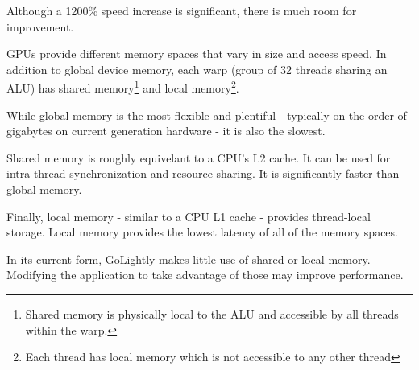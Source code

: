 Although a 1200\% speed increase is significant, there is much room for improvement. 

GPUs provide different memory spaces that vary in size and access speed. In addition to global device memory, each warp (group of 32 threads sharing an ALU) has shared memory\footnote{Shared memory is physically local to the ALU and accessible by all threads within the warp.} and local memory\footnote{Each thread has local memory which is not accessible to any other thread}.

While global memory is the most flexible and plentiful - typically on the order of gigabytes on current generation hardware - it is also the slowest. 

Shared memory is roughly equivelant to a CPU's L2 cache. It can be used for intra-thread synchronization and resource sharing. It is significantly faster than global memory.

Finally, local memory - similar to a CPU L1 cache - provides thread-local storage. Local memory provides the lowest latency of all of the memory spaces.

In its current form, GoLightly makes little use of shared or local memory. Modifying the application to take advantage of those may improve performance.







